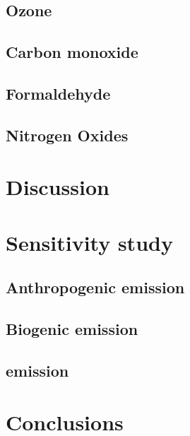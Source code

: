 \subsection{Ozone}\label{ssec:2006/gen/ozone}
\subsection{Carbon monoxide}\label{ssec:2006/gen/co}
\subsection{Formaldehyde}\label{ssec:2006/gen/form}
\subsection{Nitrogen Oxides}\label{ssec:2006/gen/nox}

\section{Discussion}\label{sec:2006/discussion}

\section{Sensitivity study}\label{sec:2006/sens}
\subsection{Anthropogenic emission}\label{ssec:2006/sens/anthrop}
\subsection{Biogenic emission}\label{ssec:2006/sens/bio}
\subsection{{\lnox} emission}\label{ssec:2006/sens/lnox}

\section{Conclusions}\label{sec:2006/conslusion}